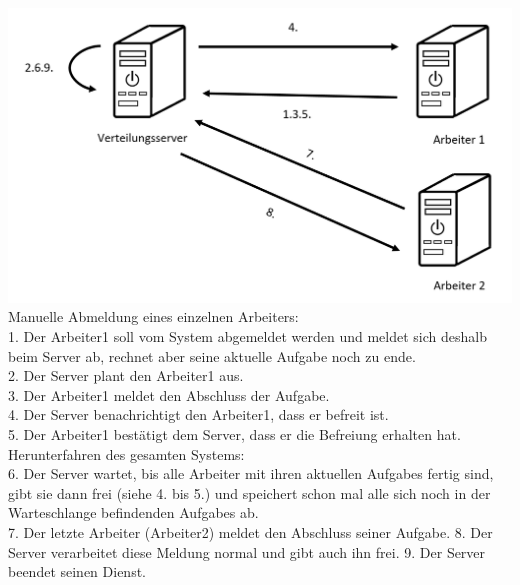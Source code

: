 \documentclass[a4paper,12pt]{article}
\begin{document}
\includegraphics[width=\linewidth]{Systemmodelle/Models/Shutdown.PNG}
\\
Manuelle Abmeldung eines einzelnen \gls{Arbeiter}s:\\
1. Der \gls{Arbeiter}1 soll vom System abgemeldet werden und meldet sich deshalb beim \gls{Server} ab, rechnet aber seine aktuelle \gls{Aufgabe} noch zu ende.\\
2. Der \gls{Server} plant den \gls{Arbeiter}1 aus.\\
3. Der \gls{Arbeiter}1 meldet den Abschluss der \gls{Aufgabe}.\\
4. Der \gls{Server} benachrichtigt den \gls{Arbeiter}1, dass er befreit ist.\\
5. Der \gls{Arbeiter}1 bestätigt dem \gls{Server}, dass er die Befreiung erhalten hat.\\
Herunterfahren des gesamten Systems:\\
6. Der \gls{Server} wartet, bis alle \gls{Arbeiter} mit ihren aktuellen \glspl{Aufgabe} fertig sind, gibt sie dann frei (siehe 4. bis 5.) und speichert schon mal alle sich noch in der \gls{Warteschlange} befindenden \glspl{Aufgabe} ab.\\
7. Der letzte \gls{Arbeiter} (\gls{Arbeiter}2) meldet den Abschluss seiner \gls{Aufgabe}.
8. Der \gls{Server} verarbeitet diese Meldung normal und gibt auch ihn frei.
9. Der \gls{Server} beendet seinen Dienst.
\end{document}
